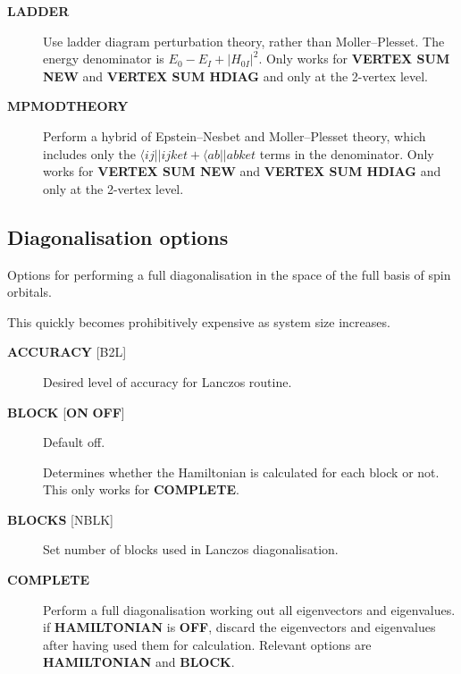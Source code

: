 \documentclass[openany,a4paper,10pt]{manual}
\newcommand{\bra}{\ensuremath{\langle}}
\begin{document}
\begin{description}
\item[\textbf{LADDER}]
Use ladder diagram perturbation theory, rather than Moller--Plesset.
The energy denominator is $E_0-E_I+|H_{0I}|^2$.  Only works
for \textbf{VERTEX SUM NEW} and \textbf{VERTEX SUM HDIAG} and only at the
2-vertex level.

\item[\textbf{MPMODTHEORY}]
Perform a hybrid of Epstein--Nesbet and Moller--Plesset theory,
which includes only the $\bra ij||ij ket +\bra ab||ab ket$
terms in the denominator.  Only works for \textbf{VERTEX SUM NEW} and
\textbf{VERTEX SUM HDIAG} and only at the 2-vertex level.

\end{description}


\subsection{Diagonalisation options}

Options for performing a full diagonalisation in the space of the full
basis of spin orbitals.

\begin{notice}[warning]
This quickly becomes prohibitively expensive as system size increases.
\end{notice}
\begin{description}
\item[\textbf{ACCURACY} {[}B2L{]}]
Desired level of accuracy for Lanczos routine.

\item[\textbf{BLOCK} {[}\textbf{ON} \textbf{OFF}{]}]
Default off.

Determines whether the Hamiltonian is calculated for each block
or not.  This only works for \textbf{COMPLETE}.

\item[\textbf{BLOCKS} {[}NBLK{]}]
Set number of blocks used in Lanczos diagonalisation.

\item[\textbf{COMPLETE}]
Perform a full diagonalisation working out all eigenvectors
and eigenvalues.  if \textbf{HAMILTONIAN} is \textbf{OFF}, discard the
eigenvectors and eigenvalues after having used them for calculation.
Relevant options are \textbf{HAMILTONIAN} and \textbf{BLOCK}.

\end{description}
\end{document}

